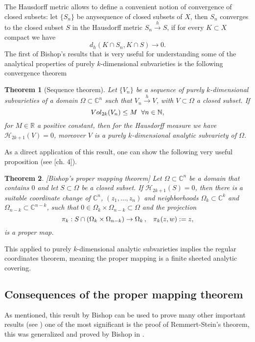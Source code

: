 \documentclass[letterpaper]{book}
\newtheorem{theorem}{Theorem}[section]
\newcommand{\nat}{\ensuremath{ \mathbb N }}
\newcommand{\co}{\ensuremath{\mathbb C }}
\newcommand{\con}{\ensuremath{\mathbb{C}^n}}
\newcommand{\re}{\ensuremath{\mathbb R }}
\begin{document}
The Hausdorff metric allows to define a convenient notion of convergence of closed subsets: let $\{S_n \}$ be anysequence of closed subsets of $X$, then $S_n$ converges to the closed subset $S$ in the Hausdorff metric $S_n\overset{h}\rightarrow S$, if for every $K\subset X$ compact we have
\[
  d_h(K\cap S_n,K\cap S)\rightarrow 0.
\]
The first of Bishop's results that is very useful for understanding some of the analytical properties of purely $k$-dimensional subvarieties is the following convergence theorem
\begin{theorem}[Sequence theorem] \label{bishop sequence}Let $\lbrace
        V_n\rbrace$ be a sequence of purely $k$-dimensional subvarieties of a
        domain $\Omega\subset\con$ such that $V_n\overset{h}\rightarrow V$, with
        $V\subset\Omega$ a closed subset. If $$ Vol_{2k}(V_n)\leq M
        \hspace*{0.2cm}\forall n\in\nat, $$
        \noindent for $M\in\re$ a positive constant, then for the Hausdorff
        measure we have $\mathcal{H}_{2k+1}(V)=0$, moreover $V$ is a purely
        $k$-dimensional analytic subvariety of $\Omega$.
\end{theorem}
As a direct application of this result, one can show the following very useful proposition (see \cite{Stolzenberg}[ch. 4]).
\begin{theorem}\label{bishop mapping}[Bishop's proper mapping theorem] Let
        $\Omega\subset\con$ be a domain that contains $0$ and let
        $S\subset\Omega$ be a closed subset. If $\mathcal{H}_{2k+1}(S)=0$, then there
        is a suitable coordinate change of $\con$, $(z_1,\ldots,z_n)$ and
        neighborhoods $\Omega_k\subset\co^k$ and $\Omega_{n-k}\subset\co^{n-k}$, such that
        $0\in\Omega_k\times\Omega_{n-k}\subset\Omega$ and the projection
        \[
          \pi_k:S\cap(\Omega_k\times\Omega_{n-k})\rightarrow\Omega_k\, ,\hspace{0.3cm}\pi_k(z,w):=z,
        \]
        \noindent is a proper map.
\end{theorem}
\noindent This applied to purely $k$-dimensional analytic
subvarieties implies the regular coordinates theorem, meaning the proper
mapping is a finite sheeted analytic covering.

\subsection{Consequences of the proper mapping theorem}

\noindent As mentioned, this result by Bishop can be used to prove many other important
results (see \cite{Stolzenberg}) one of the most significant is the proof of
Remmert-Stein's theorem, this was generalized and proved by Bishop in
\cite{Bishop}.
\end{document}
